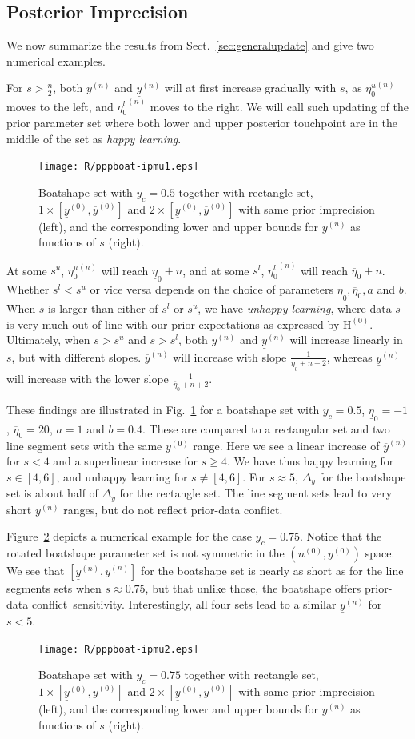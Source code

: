 \documentclass[runningheads,a4paper]{llncs}
\def\pdc{prior-data conflict}
\newcommand{\uz}{^{(0)}} %
\newcommand{\un}{^{(n)}} %
\newcommand{\ul}[1]{\underline{#1}}
\newcommand{\ol}[1]{\overline{#1}}
\def\yz{y\uz}
\def\yn{y\un}
\def\yzl{\ul{y}\uz}
\def\yzu{\ol{y}\uz}
\def\ynl{\ul{y}\un}
\def\ynu{\ol{y}\un}
\def\nz{n\uz}
\def\EZ{\mathrm{H}\uz}
\def\ezl{\ul{\eta}_0}
\def\ezu{\ol{\eta}_0}
\begin{document}
\subsection{Posterior Imprecision}
\label{sec:posteriorimprecision}

We now summarize the results from Sect.~\ref{sec:generalupdate}
and give two numerical examples.

For $s > \frac{n}{2}$, both $\ynu$ and $\ynl$ will at first increase gradually with $s$,
as ${\eta_0^u}\un$ moves to the left, and ${\eta_0^l}\un$ moves to the right.
We will call such updating of the prior parameter set
where both lower and upper posterior touchpoint are in the middle of the set as \emph{happy learning}.
\begin{figure}
\texttt{[image: R/pppboat-ipmu1.eps]}
\caption{Boatshape set with $y_c = 0.5$ together with rectangle set, $1 \times [\yzl, \yzu]$ and $2 \times [\yzl, \yzu]$
with same prior imprecision (left),
and the corresponding lower and upper bounds for $\yn$ as functions of $s$ (right).}
\label{fig:ppp1}
\end{figure}
%
At some $s^u$, ${\eta_0^u}\un$ will reach $\ezl + n$,
and at some $s^l$, ${\eta_0^l}\un$ will reach $\ezu + n$.
Whether $s^l < s^u$ or vice versa depends on
the choice of parameters $\ezl, \ezu, a$ and $b$.
When $s$ is larger than either of $s^l$ or $s^u$,
we have \emph{unhappy learning},
where data $s$ is very much out of line with our prior expectations as expressed by $\EZ$.
Ultimately, when $s > s^u$ and $s > s^l$,
both $\ynu$ and $\ynl$ will increase linearly in $s$, but with different slopes.
$\ynu$ will increase with slope $\frac{1}{\ezl + n + 2}$,
whereas $\ynl$ will increase with the lower slope $\frac{1}{\ezu + n + 2}$.

These findings are illustrated in Fig.~\ref{fig:ppp1}
for a boatshape set with $y_c = 0.5$, $\ezl = -1$, $\ezu = 20$, $a=1$ and $b=0.4$. 
These are compared to a rectangular set and two line segment sets with the same $\yz$ range.
Here we see a linear increase of $\ynu$ for $s < 4$ and a superlinear increase for $s \ge 4$.
We have thus happy learning for $s \in [4,6]$, and unhappy learning for $s \neq [4,6]$.
For $s \approx 5$, $\Delta_y$ for the boatshape set is about half of $\Delta_y$ for the rectangle set.
The line segment sets lead to very short $\yn$ ranges, but do not reflect \pdc.

Figure~\ref{fig:ppp2} depicts a numerical example for the case $y_c = 0.75$.
Notice that the rotated boatshape parameter set is not symmetric in the $(\nz, \yz)$ space.
We see that $[\ynl, \ynu]$ for the boatshape set is nearly as short as for the line segments sets
when $s \approx 0.75$, but that unlike those, the boatshape offers \pdc\ sensitivity.
Interestingly, all four sets lead to a similar $\ynl$ for $s < 5$.
\begin{figure}
\texttt{[image: R/pppboat-ipmu2.eps]}
\caption{Boatshape set with $y_c = 0.75$ together with rectangle set, $1 \times [\yzl, \yzu]$ and $2 \times [\yzl, \yzu]$
with same prior imprecision (left),
and the corresponding lower and upper bounds for $\yn$ as functions of $s$ (right).}
\label{fig:ppp2}
\end{figure}
\end{document}
